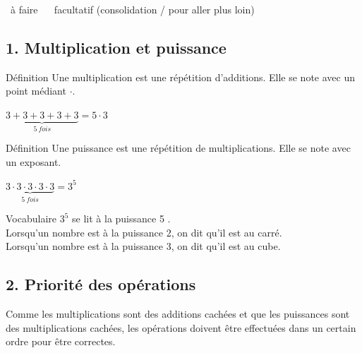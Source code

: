  \vfill
\begin{center}
\small \case~à faire \qquad \oblig~ \qquad \faclt~facultatif (consolidation / pour aller plus loin)
\end{center}
\vspace{1em}

\newpage
{}

\subsection*{1. Multiplication et puissance}

\begin{regle}{Définition}
Une \textcolor{themeNO}{multiplication} est une répétition d'additions. Elle se note avec un point médiant $\cdot$.
\end{regle}

\begin{center}$\underset{5\ fois}{\underbrace{3+3+3+3+3}}=5\cdot 3$\end{center}

\begin{regle}{Définition}
Une \textcolor{themeNO}{puissance} est une répétition de multiplications. Elle se note avec un exposant.
\end{regle}

\begin{center}$\underset{5\ fois}{\underbrace{3\cdot 3\cdot 3\cdot 3\cdot3}}=3^{5}$\end{center}

\begin{astuce}{Vocabulaire}
$3^5$ se lit  \textcolor{themeNO}{à la puissance} 5 \fg.\\[2pt]
Lorsqu'un nombre est à la puissance 2, on dit qu'il est au \textcolor{themeNO}{carré}.\\[2pt]
Lorsqu'un nombre est à la puissance 3, on dit qu'il est au \textcolor{themeNO}{cube}.
\end{astuce}

\vfill
\subsection*{2. Priorité des opérations}

Comme les multiplications sont des additions cachées et que les puissances sont des multiplications cachées, les opérations doivent être effectuées dans un certain ordre pour être correctes.

